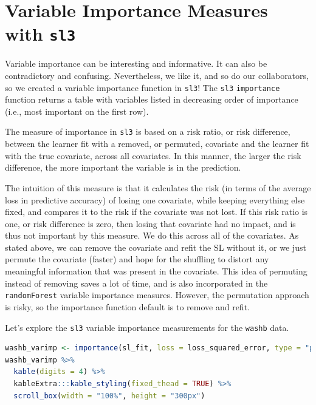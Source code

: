 \documentclass[
  12pt, krantz2,
]{krantz}
\newcommand{\passthrough}[1]{#1}
\theoremstyle{definition}
\theoremstyle{definition}
\theoremstyle{definition}
\newcommand{\1}{\mathbbm{1}}
\begin{document}
\hypertarget{variable-importance-measures-with-sl3}{%
\section*{\texorpdfstring{Variable Importance Measures with \texttt{sl3}}{Variable Importance Measures with sl3}}\label{variable-importance-measures-with-sl3}}


Variable importance can be interesting and informative. It can also be
contradictory and confusing. Nevertheless, we like it, and so do our
collaborators, so we created a variable importance function in \passthrough{\lstinline!sl3!}! The \passthrough{\lstinline!sl3!}
\passthrough{\lstinline!importance!} function returns a table with variables listed in decreasing order
of importance (i.e., most important on the first row).

The measure of importance in \passthrough{\lstinline!sl3!} is based on a risk ratio, or risk difference,
between the learner fit with a removed, or permuted, covariate and the learner
fit with the true covariate, across all covariates. In this manner, the larger
the risk difference, the more important the variable is in the prediction.

The intuition of this measure is that it calculates the risk (in terms of the
average loss in predictive accuracy) of losing one covariate, while keeping
everything else fixed, and compares it to the risk if the covariate was not
lost. If this risk ratio is one, or risk difference is zero, then losing that
covariate had no impact, and is thus not important by this measure. We do this
across all of the covariates. As stated above, we can remove the covariate and
refit the SL without it, or we just permute the covariate (faster)
and hope for the shuffling to distort any meaningful information that was
present in the covariate. This idea of permuting instead of removing saves a lot
of time, and is also incorporated in the \passthrough{\lstinline!randomForest!} variable importance
measures. However, the permutation approach is risky, so the importance function
default is to remove and refit.

Let's explore the \passthrough{\lstinline!sl3!} variable importance measurements for the \passthrough{\lstinline!washb!} data.

\begin{lstlisting}[language=R]
washb_varimp <- importance(sl_fit, loss = loss_squared_error, type = "permute")
washb_varimp %>%
  kable(digits = 4) %>%
  kableExtra:::kable_styling(fixed_thead = TRUE) %>%
  scroll_box(width = "100%", height = "300px")
\end{lstlisting}
\end{document}
